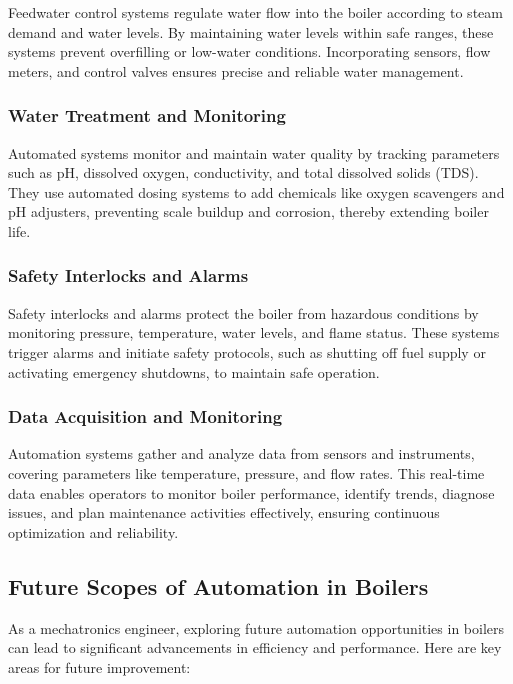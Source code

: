 Feedwater control systems regulate water flow into the boiler according to steam demand and water levels. By maintaining water levels within safe ranges, these systems prevent overfilling or low-water conditions. Incorporating sensors, flow meters, and control valves ensures precise and reliable water management.

\subsubsection{Water Treatment and Monitoring}

Automated systems monitor and maintain water quality by tracking parameters such as pH, dissolved oxygen, conductivity, and total dissolved solids (TDS). They use automated dosing systems to add chemicals like oxygen scavengers and pH adjusters, preventing scale buildup and corrosion, thereby extending boiler life.

\subsubsection{Safety Interlocks and Alarms}

Safety interlocks and alarms protect the boiler from hazardous conditions by monitoring pressure, temperature, water levels, and flame status. These systems trigger alarms and initiate safety protocols, such as shutting off fuel supply or activating emergency shutdowns, to maintain safe operation.

\subsubsection{Data Acquisition and Monitoring}

Automation systems gather and analyze data from sensors and instruments, covering parameters like temperature, pressure, and flow rates. This real-time data enables operators to monitor boiler performance, identify trends, diagnose issues, and plan maintenance activities effectively, ensuring continuous optimization and reliability.

\subsection{Future Scopes of Automation in Boilers}

As a mechatronics engineer, exploring future automation opportunities in boilers can lead to significant advancements in efficiency and performance. Here are key areas for future improvement:

